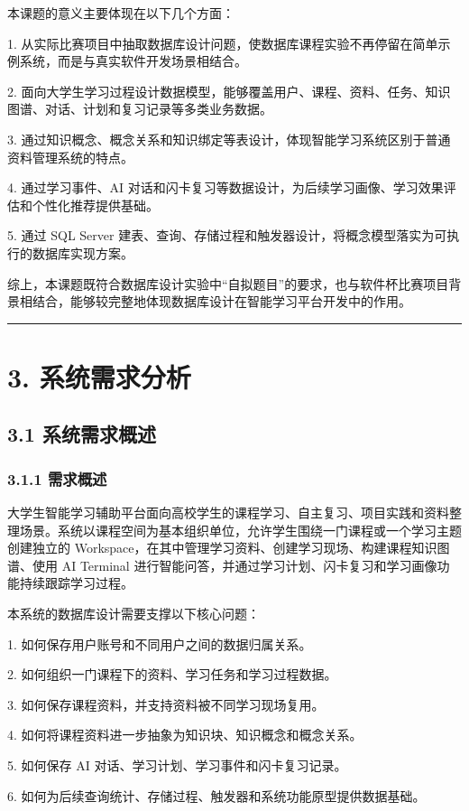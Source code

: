 \documentclass[10pt,a4paper,fontset=none]{ctexart}
\begin{document}
本课题的意义主要体现在以下几个方面：\par

1. 从实际比赛项目中抽取数据库设计问题，使数据库课程实验不再停留在简单示例系统，而是与真实软件开发场景相结合。\par
2. 面向大学生学习过程设计数据模型，能够覆盖用户、课程、资料、任务、知识图谱、对话、计划和复习记录等多类业务数据。\par
3. 通过知识概念、概念关系和知识绑定等表设计，体现智能学习系统区别于普通资料管理系统的特点。\par
4. 通过学习事件、AI 对话和闪卡复习等数据设计，为后续学习画像、学习效果评估和个性化推荐提供基础。\par
5. 通过 SQL Server 建表、查询、存储过程和触发器设计，将概念模型落实为可执行的数据库实现方案。\par

综上，本课题既符合数据库设计实验中“自拟题目”的要求，也与软件杯比赛项目背景相结合，能够较完整地体现数据库设计在智能学习平台开发中的作用。\par

\bigskip\hrule\bigskip

\clearpage
\section*{3. 系统需求分析}

\subsection*{3.1 系统需求概述}

\subsubsection*{3.1.1 需求概述}

大学生智能学习辅助平台面向高校学生的课程学习、自主复习、项目实践和资料整理场景。系统以课程空间为基本组织单位，允许学生围绕一门课程或一个学习主题创建独立的 Workspace，在其中管理学习资料、创建学习现场、构建课程知识图谱、使用 AI Terminal 进行智能问答，并通过学习计划、闪卡复习和学习画像功能持续跟踪学习过程。\par

本系统的数据库设计需要支撑以下核心问题：\par

1. 如何保存用户账号和不同用户之间的数据归属关系。\par
2. 如何组织一门课程下的资料、学习任务和学习过程数据。\par
3. 如何保存课程资料，并支持资料被不同学习现场复用。\par
4. 如何将课程资料进一步抽象为知识块、知识概念和概念关系。\par
5. 如何保存 AI 对话、学习计划、学习事件和闪卡复习记录。\par
6. 如何为后续查询统计、存储过程、触发器和系统功能原型提供数据基础。\par
\end{document}
